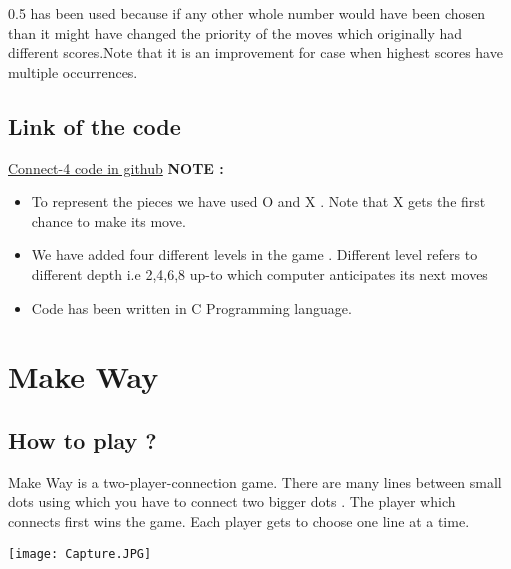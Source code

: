 \documentclass[11pt]{article}
\begin{document}
0.5 has been used because if any other whole number would have been chosen than it might have changed the priority of the moves which originally had different scores.Note that it is an improvement for case when highest scores have multiple occurrences.

\subsection{Link of the code}
\href{https://github.com/shubham0405/connect-4/connect.c}{\color{blue}Connect-4 code in github}\linebreak \linebreak
\textbf{NOTE :}
\begin{itemize}
    \item To represent the pieces we have used O and X . Note that X gets the first chance to make its move.
\item We have added four different levels in the game . Different level refers to different depth i.e 2,4,6,8 up-to which computer anticipates its next moves
\item Code has been written in C Programming language.
\end{itemize}



\pagebreak
\section{Make Way}
\subsection{How to play ?}
Make Way is a two-player-connection game. There are many lines between small dots using which you have to connect two bigger dots . The player which connects first wins the game. Each player gets to choose one line at a time.

\texttt{[image: Capture.JPG]}
\end{document}
